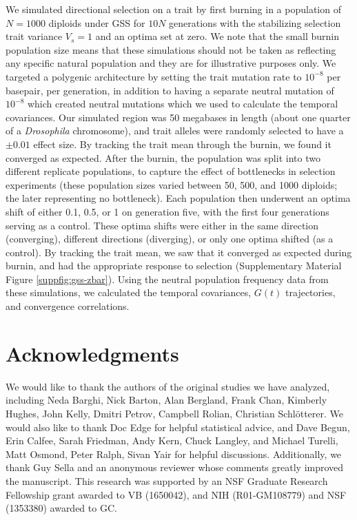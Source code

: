 \documentclass[11pt]{article}
\begin{document}
We simulated directional selection on a trait by first burning in a population
of $N = 1000$ diploids under GSS for $10N$ generations with the stabilizing
selection trait variance $V_s = 1$ and an optima set at zero.  We note that the
small burnin population size means that these simulations should not be taken
as reflecting any specific natural population and they are for illustrative
purposes only.  We targeted a polygenic architecture by setting the trait
mutation rate to $10^{-8}$ per basepair, per generation, in addition to having
a separate neutral mutation of $10^{-8}$ which created neutral mutations which
we used to calculate the temporal covariances. Our simulated region was 50
megabases in length (about one quarter of a \emph{Drosophila} chromosome), and
trait alleles were randomly selected to have a $\pm 0.01$ effect size. By
tracking the trait mean through the burnin, we found it converged as expected.
After the burnin, the population was split into two different replicate
populations, to capture the effect of bottlenecks in selection experiments
(these population sizes varied between 50, 500, and 1000 diploids; the
later representing no bottleneck). Each population then underwent an optima
shift of either 0.1, 0.5, or 1 on generation five, with the first four
generations serving as a control. These optima shifts were either in the same
direction (converging), different directions (diverging), or only one optima
shifted (as a control). By tracking the trait mean, we saw that it converged as
expected during burnin, and had the appropriate response to selection
(Supplementary Material Figure \ref{suppfig:gss-zbar}). Using the neutral
population frequency data from these simulations, we calculated the temporal
covariances, $G(t)$ trajectories, and convergence correlations.


\section{Acknowledgments} 

We would like to thank the authors of the original studies we have analyzed,
including Neda Barghi, Nick Barton, Alan Bergland, Frank Chan, Kimberly Hughes,
John Kelly, Dmitri Petrov, Campbell Rolian, Christian Schl{\"o}tterer. We would
also like to thank Doc Edge for helpful statistical advice, and Dave Begun,
Erin Calfee, Sarah Friedman, Andy Kern, Chuck Langley, and Michael Turelli,
Matt Osmond, Peter Ralph, Sivan Yair for helpful discussions. Additionally, we
thank Guy Sella and an anonymous reviewer whose comments greatly improved the
manuscript. This research was supported by an NSF Graduate Research Fellowship
grant awarded to VB (1650042), and NIH (R01-GM108779) and NSF (1353380) awarded
to GC.
\end{document}
